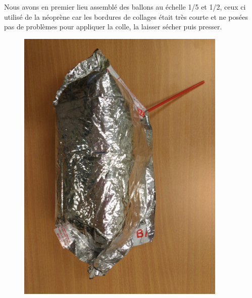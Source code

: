 \documentclass[a4paper,11pt]{article}
\begin{document}
Nous avons en premier lieu assemblé des ballons au échelle 1/5 et 1/2, ceux ci utilisé de la néoprène car les bordures de collages était très courte et ne posées pas de problèmes pour appliquer la colle, la laisser sécher puis presser. 

\begin{figure}[H]
 \centering
 \includegraphics[width=10cm, angle=90]{../Images/ballon2.jpg}
\end{figure}
\end{document}
